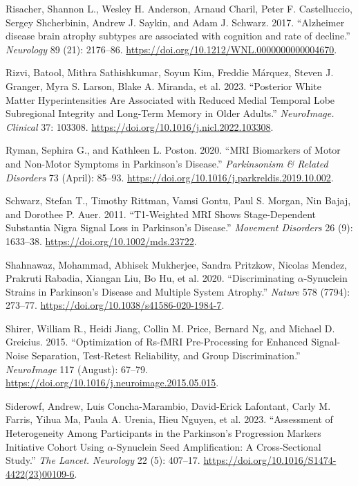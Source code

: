 \documentclass[
  table]{article}
\newlength{\cslhangindent}
\newenvironment{CSLReferences}[2] %
 {\begin{list}{}{%
  \setlength{\itemindent}{0pt}
  \setlength{\leftmargin}{0pt}
  \setlength{\parsep}{0pt}
  \ifodd #1
   \setlength{\leftmargin}{\cslhangindent}
   \setlength{\itemindent}{-1\cslhangindent}
  \fi
  \setlength{\itemsep}{#2\baselineskip}}}
 {\end{list}}
\begin{document}
\begin{CSLReferences}{1}{0}
Risacher, Shannon L., Wesley H. Anderson, Arnaud Charil, Peter F.
Castelluccio, Sergey Shcherbinin, Andrew J. Saykin, and Adam J. Schwarz.
2017. {``{Alzheimer disease brain atrophy subtypes are associated with
cognition and rate of decline}.''} \emph{Neurology} 89 (21): 2176--86.
\url{https://doi.org/10.1212/WNL.0000000000004670}.

Rizvi, Batool, Mithra Sathishkumar, Soyun Kim, Freddie Márquez, Steven
J. Granger, Myra S. Larson, Blake A. Miranda, et al. 2023. {``Posterior
White Matter Hyperintensities Are Associated with Reduced Medial
Temporal Lobe Subregional Integrity and Long-Term Memory in Older
Adults.''} \emph{NeuroImage. Clinical} 37: 103308.
\url{https://doi.org/10.1016/j.nicl.2022.103308}.

Ryman, Sephira G., and Kathleen L. Poston. 2020. {``{MRI} Biomarkers of
Motor and Non-Motor Symptoms in {Parkinson}'s Disease.''}
\emph{Parkinsonism \& Related Disorders} 73 (April): 85--93.
\url{https://doi.org/10.1016/j.parkreldis.2019.10.002}.

Schwarz, Stefan T., Timothy Rittman, Vamsi Gontu, Paul S. Morgan, Nin
Bajaj, and Dorothee P. Auer. 2011. {``T1-{Weighted} {MRI} Shows
Stage-Dependent Substantia Nigra Signal Loss in {Parkinson}'s
Disease.''} \emph{Movement Disorders} 26 (9): 1633--38.
\url{https://doi.org/10.1002/mds.23722}.

Shahnawaz, Mohammad, Abhisek Mukherjee, Sandra Pritzkow, Nicolas Mendez,
Prakruti Rabadia, Xiangan Liu, Bo Hu, et al. 2020. {``Discriminating
\(\alpha\)-Synuclein Strains in {Parkinson}'s Disease and Multiple
System Atrophy.''} \emph{Nature} 578 (7794): 273--77.
\url{https://doi.org/10.1038/s41586-020-1984-7}.

Shirer, William R., Heidi Jiang, Collin M. Price, Bernard Ng, and
Michael D. Greicius. 2015. {``Optimization of Rs-{fMRI} {Pre}-Processing
for {Enhanced} {Signal}-{Noise} {Separation}, {Test}-{Retest}
{Reliability}, and {Group} {Discrimination}.''} \emph{NeuroImage} 117
(August): 67--79.
\url{https://doi.org/10.1016/j.neuroimage.2015.05.015}.

Siderowf, Andrew, Luis Concha-Marambio, David-Erick Lafontant, Carly M.
Farris, Yihua Ma, Paula A. Urenia, Hieu Nguyen, et al. 2023.
{``Assessment of Heterogeneity Among Participants in the {Parkinson}'s
{Progression} {Markers} {Initiative} Cohort Using \(\alpha\)-Synuclein
Seed Amplification: A Cross-Sectional Study.''} \emph{The Lancet.
Neurology} 22 (5): 407--17.
\url{https://doi.org/10.1016/S1474-4422(23)00109-6}.


\end{CSLReferences}
\end{document}
